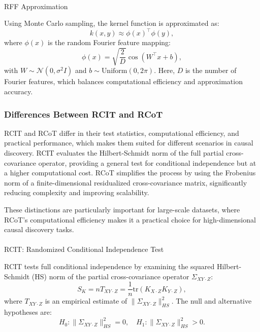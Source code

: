 \documentclass[
]{article}
\makeatletter
\let\oldparagraph\paragraph
\renewcommand{\paragraph}{
    \@ifstar
      \xxxParagraphStar
      \xxxParagraphNoStar
  }
\newcommand{\xxxParagraphStar}[1]{\oldparagraph*{#1}\mbox{}}
\newcommand{\xxxParagraphNoStar}[1]{\oldparagraph{#1}\mbox{}}
\makeatother
\begin{document}
\paragraph{RFF Approximation}\label{rff-approximation}

Using Monte Carlo sampling, the kernel function is approximated as: \[
k(x, y) \approx \phi(x)^\top \phi(y),
\] where \(\phi(x)\) is the random Fourier feature mapping: \[
\phi(x) = \sqrt{\frac{2}{D}} \cos(W^\top x + b),
\] with \(W \sim \mathcal{N}(0, \sigma^2 I)\) and
\(b \sim \text{Uniform}(0, 2\pi)\). Here, \(D\) is the number of Fourier
features, which balances computational efficiency and approximation
accuracy.

\subsubsection{Differences Between RCIT and
RCoT}\label{differences-between-rcit-and-rcot}

RCIT and RCoT differ in their test statistics, computational efficiency,
and practical performance, which makes them suited for different
scenarios in causal discovery. RCIT evaluates the Hilbert-Schmidt norm
of the full partial cross-covariance operator, providing a general test
for conditional independence but at a higher computational cost. RCoT
simplifies the process by using the Frobenius norm of a
finite-dimensional residualized cross-covariance matrix, significantly
reducing complexity and improving scalability.

These distinctions are particularly important for large-scale datasets,
where RCoT's computational efficiency makes it a practical choice for
high-dimensional causal discovery tasks.

\paragraph{RCIT: Randomized Conditional Independence
Test}\label{rcit-randomized-conditional-independence-test}

RCIT tests full conditional independence by examining the squared
Hilbert-Schmidt (HS) norm of the partial cross-covariance operator
\(\Sigma_{XY \cdot Z}\): \[
S_K = n T_{XY \cdot Z} = \frac{1}{n} \text{tr}(K_{X \cdot Z} K_{Y \cdot Z}),
\] where \(T_{XY \cdot Z}\) is an empirical estimate of
\(\|\Sigma_{XY \cdot Z}\|^2_{HS}\). The null and alternative hypotheses
are: \[
H_0: \|\Sigma_{XY \cdot Z}\|^2_{HS} = 0, \quad H_1: \|\Sigma_{XY \cdot Z}\|^2_{HS} > 0.
\]
\end{document}
